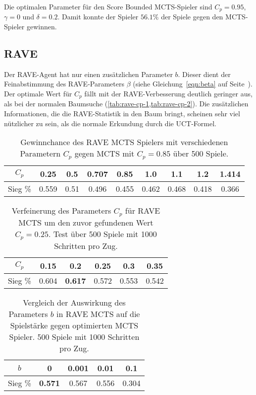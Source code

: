 \bigskip
Die optimalen Parameter für den Score Bounded MCTS-Spieler sind $C_p=0.95$, $\gamma=0$ und $\delta=0.2$. 
Damit konnte der Spieler $56.1\%$ der Spiele gegen den MCTS-Spieler gewinnen.


\pagebreak[1]
\subsection{RAVE}

Der RAVE-Agent hat nur einen zusätzlichen Parameter $b$. Dieser dient der Feinabstimmung des RAVE-Parameters $\beta$ (siehe Gleichung~\ref{eqn:beta} auf Seite~\pageref{eqn:beta}).
Der optimale Wert für $C_p$ fällt mit der RAVE-Verbesserung deutlich geringer aus, als bei der normalen Baumsuche (\cref{tab:rave-cp-1,tab:rave-cp-2}).
Die zusätzlichen Informationen, die die RAVE-Statistik in den Baum bringt, scheinen sehr viel nützlicher zu sein, als die normale Erkundung durch die UCT-Formel.

\begin{table}[h!]
	\centering
	\begin{tabular}{|c||c|c|c|c|c|c|c|c|}
		\hline
		$C_p$ & 0.25 & 0.5 & 0.707 & 0.85 & 1.0 & 1.1 & 1.2 & 1.414 \\
		\hline
		Sieg \% & 0.559 & 0.51 & 0.496 & 0.455 & 0.462 & 0.468 & 0.418 & 0.366 \\
		\hline
	\end{tabular}
	\caption{Gewinnchance des RAVE MCTS Spielers mit verschiedenen Parametern $C_p$ gegen MCTS mit $C_p=0.85$ über 500 Spiele.}
	\label{tab:rave-cp-1}
\end{table}

\begin{table}[h!]
	\centering
	\begin{tabular}{|c||c|c|c|c|c|}
		\hline
		$C_p$ & 0.15 & 0.2 & 0.25 & 0.3 & 0.35 \\
		\hline
		Sieg \% & 0.604 & \textbf{0.617} & 0.572 & 0.553 & 0.542 \\
		\hline
	\end{tabular}
	\caption{Verfeinerung des Parameters $C_p$ für RAVE MCTS um den zuvor gefundenen Wert $C_p=0.25$. Test über 500 Spiele mit 1000 Schritten pro Zug.}
	\label{tab:rave-cp-2}
\end{table}


\begin{table}[h!]
	\centering
	\begin{tabular}{|c||c|c|c|c|}
		\hline
		$b$ & 0 & 0.001 & 0.01 & 0.1 \\
		\hline
		Sieg \% & \textbf{0.571} & 0.567 & 0.556 & 0.304 \\
		\hline
	\end{tabular}
	\caption{Vergleich der Auswirkung des Parameters $b$ in RAVE MCTS auf die Spielstärke gegen optimierten MCTS Spieler. 500 Spiele mit 1000 Schritten pro Zug.}
	\label{tab:rave-best-param}
\end{table}

